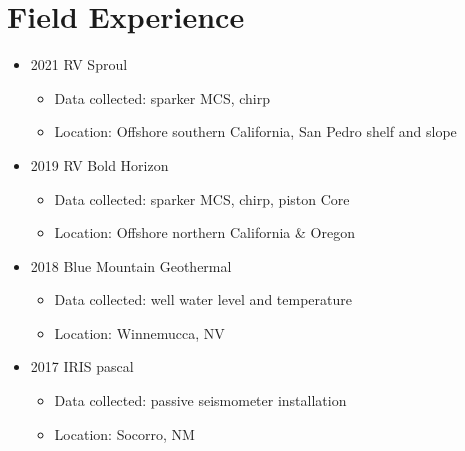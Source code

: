 \documentclass[11pt]{article}
\begin{document}
\section{Field Experience}
\label{sec:org5b90801}
\begin{itemize}
\item 2021 RV Sproul
\begin{itemize}
\item Data collected: sparker MCS, chirp
\item Location: Offshore southern California, San Pedro shelf and slope
\end{itemize}
\item 2019 RV Bold Horizon
\begin{itemize}
\item Data collected: sparker MCS, chirp, piston Core
\item Location: Offshore northern California \& Oregon
\end{itemize}
\item 2018 Blue Mountain Geothermal
\begin{itemize}
\item Data collected: well water level and temperature
\item Location: Winnemucca, NV
\end{itemize}
\item 2017 IRIS pascal
\begin{itemize}
\item Data collected: passive seismometer installation
\item Location: Socorro, NM
\end{itemize}
\end{itemize}
\end{document}
